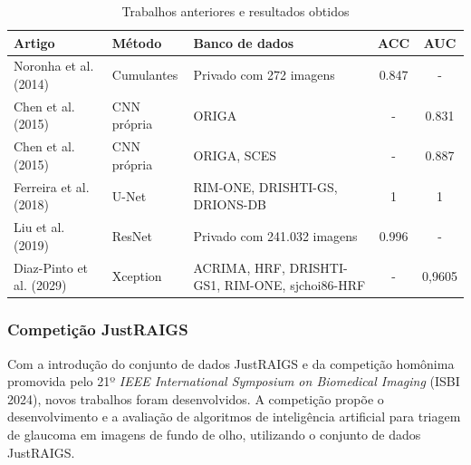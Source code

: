 \documentclass[12pt]{article}
\begin{document}
\begin{table}[htb]
    \centering
    \small
    \renewcommand{\arraystretch}{1.2}
    \begin{tabularx}{\textwidth}{>{\raggedright\arraybackslash}p{3cm}l>{\raggedright\arraybackslash}Xcc}
    \toprule
    \textbf{Artigo} & \textbf{Método} & \textbf{Banco de dados} & \textbf{ACC} & \textbf{AUC} \\
    \midrule
    Noronha et al. (2014)~\cite{noronha2014hoc} & Cumulantes  & Privado com 272 imagens        & 0.847 &  -    \\

    Chen et al. (2015)~\cite{chen2015cnn}       & CNN própria & ORIGA                          & -     & 0.831 \\

    Chen et al. (2015)~\cite{chen2015cnn}       & CNN própria & ORIGA, SCES                    & -     & 0.887 \\

    Ferreira et al. (2018)~\cite{ferreira_cnn_2018} & U-Net   & RIM-ONE, DRISHTI-GS, DRIONS-DB & 1     & 1     \\

    Liu et al. (2019)~\cite{liu_cnn_2019}       & ResNet      & Privado com 241.032 imagens    & 0.996 & -     \\

    Diaz-Pinto et al. (2029)~\cite{liu_cnn_2019} & Xception & ACRIMA, HRF, DRISHTI-GS1, RIM-ONE, sjchoi86-HRF & - & 0,9605 \\

    \bottomrule
    \end{tabularx}
    \renewcommand{\arraystretch}{1}
    \caption{Trabalhos anteriores e resultados obtidos}
    \label{tab:trabalhos}
\end{table}


\subsubsection{Competição JustRAIGS}
\label{sec:review:related:justraigs}

Com a introdução do conjunto de dados JustRAIGS e da competição homônima promovida pelo 21º \textit{IEEE International Symposium on Biomedical Imaging} (ISBI 2024), novos trabalhos foram desenvolvidos. A competição propõe o desenvolvimento e a avaliação de algoritmos de inteligência artificial para triagem de glaucoma em imagens de fundo de olho, utilizando o conjunto de dados JustRAIGS.
\end{document}

